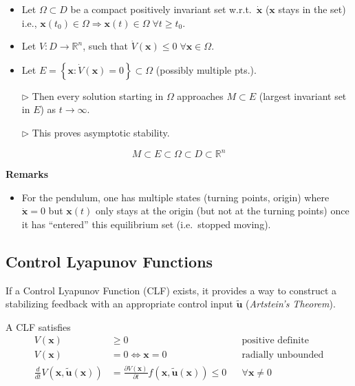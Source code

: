 \newpar{}
\begin{itemize}[leftmargin=14pt]
    \item Let $\Omega\subset D$ be a compact positively invariant set w.r.t.\ $\dot{\mathbf{x}}$ ($\mathbf{x}$ stays in the set) i.e., $\mathbf{x}(t_0)\in \Omega \Rightarrow \mathbf{x}(t)\in\Omega\; \forall t \geq t_0$.
    \item Let $V:D\to \mathbb{R}^n$, such that $\dot{V}(\mathbf{x})\leq 0\; \forall \mathbf{x}\in \Omega$.
    \item Let $E=\left\{\mathbf{x}: \dot{V}(\mathbf{x})=0\right\}\subset \Omega$ (possibly multiple pts.).
    \item[$\rhd$] Then every solution starting in $\Omega$ approaches $M\subset E$ (largest invariant set in $E$) as $t\to \infty$.
    \item[$\rhd$] This proves asymptotic stability.
\end{itemize}
\newpar{}
\begin{equation*}
    M\subset E \subset \Omega \subset D \subset \mathbb{R}^n
\end{equation*}

\newpar{}
\textbf{Remarks}
\begin{itemize}\item For the pendulum, one has multiple states (turning points, origin) where $\dot{\mathbf{x}}=0$ but $\mathbf{x}(t)$ only stays at the origin (but not at the turning points) once it has ``entered'' this equilibrium set (i.e.\ stopped moving).
\end{itemize}

\subsection{Control Lyapunov Functions}
If a Control Lyapunov Function (CLF) exists, it provides a way to construct a stabilizing feedback with an appropriate control input $\tilde{\mathbf{u}}$ (\textit{Artstein's Theorem}).

\newpar{}
A CLF satisfies
\noindent\begin{align*}
    V(\mathbf{x})                                              & \geq 0                                                                                           &  & \text{positive definite}  \\
    V(\mathbf{x})                                              & = 0 \Leftrightarrow \mathbf{x} = 0                                                               &  & \text{radially unbounded} \\
    \frac{d}{dt} V(\mathbf{x}, \tilde{\mathbf{u}}(\mathbf{x})) & = \frac{\partial V(\mathbf{x})}{\partial t} f(\mathbf{x}, \tilde{\mathbf{u}}(\mathbf{x})) \leq 0 &  & \forall \mathbf{x}\neq 0
\end{align*}

